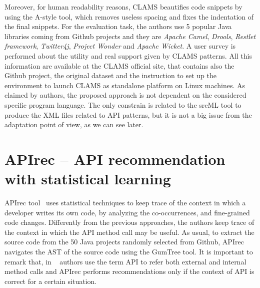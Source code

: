 Moreover, for human readability reasons, CLAMS beautifies code snippets by 
using the A-style tool, which removes useless spacing and fixes the indentation 
of the final snippets. For the evaluation task, the authors use 5 popular Java 
libraries coming from Github projects and they are \textit{Apache Camel}, 
\textit{Drools}, \textit{Restlet framework}, \textit{Twitter4j}, 
\textit{Project Wonder} and \textit{Apache Wicket}. 
A user survey is performed about the utility and real support given by CLAMS 
patterns. All this information are available at the CLAMS official site, that 
contains also the Github project, the original dataset and the instruction to 
set up the environment to launch CLAMS as standalone platform on Linux 
machines. As claimed by authors, the proposed approach is not dependent on the 
considered specific program language. The only constrain is related to the 
srcML tool to produce the XML files related to API patterns, but it is not a 
big issue from the adaptation point of view, as we can see later.



\section{APIrec -- API recommendation with statistical learning}

APIrec tool~\cite{nguyen_api_2016} uses statistical techniques to keep trace of 
the context in which a developer writes its own code, by analyzing the 
co-occurrences, and fine-grained code changes. Differently from the previous 
approaches, the authors keep trace of the context in which the API method call 
may be useful. As usual, to extract the source code from the 50 Java projects 
randomly selected from Github, APIrec navigates the AST of the source code 
using the GumTree tool. It is important to remark that, in 
~\cite{nguyen_api_2016} authors use the term API to refer both external and 
internal method calls and APIrec performs recommendations only if the context 
of API is correct for a certain situation. 


